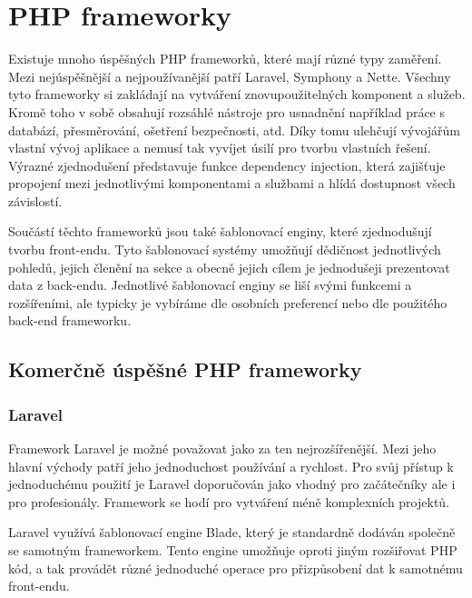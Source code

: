 \documentclass[czech,BP]{thesiskiv}
\begin{document}
\section{PHP frameworky}
\par Existuje mnoho úspěšných PHP frameworků, které mají různé typy zaměření. Mezi nejúspěšnější a nejpoužívanější patří Laravel, Symphony a Nette. Všechny tyto frameworky si zakládají na vytváření znovupoužitelných komponent a služeb. Kromě toho v sobě obsahují rozsáhlé nástroje pro usnadnění například práce s databází, přesměrování, ošetření bezpečnosti, atd. Díky tomu ulehčují vývojářům vlastní vývoj aplikace a nemusí tak vyvíjet úsilí pro tvorbu vlastních řešení. Výrazné zjednodušení představuje funkce dependency injection, která zajišťuje propojení mezi jednotlivými komponentami a službami a hlídá dostupnost všech závislostí.
\par Součástí těchto frameworků jsou také šablonovací enginy, které zjednodušují tvorbu front-endu. Tyto šablonovací systémy umožňují dědičnost jednotlivých pohledů, jejich členění na sekce a obecně jejich cílem je jednodušeji prezentovat data z back-endu. Jednotlivé šablonovací enginy se liší svými funkcemi a rozšířeními, ale typicky je vybíráme dle osobních preferencí nebo dle použitého back-end frameworku.
\subsection{Komerčně úspěšné PHP frameworky}
\subsubsection{Laravel}
\par Framework Laravel je možné považovat jako za ten nejrozšířenější. Mezi jeho hlavní východy patří jeho jednoduchost používání a rychlost. Pro svůj přístup k jednoduchému použití je Laravel doporučován jako vhodný pro začátečníky ale i pro profesionály. Framework se hodí pro vytváření méně komplexních projektů.
\par Laravel využívá šablonovací engine Blade, který je standardně dodáván společně se samotným frameworkem. Tento engine umožňuje oproti jiným rozšiřovat PHP kód, a tak provádět různé jednoduché operace pro přizpůsobení dat k samotnému front-endu.
\end{document}
